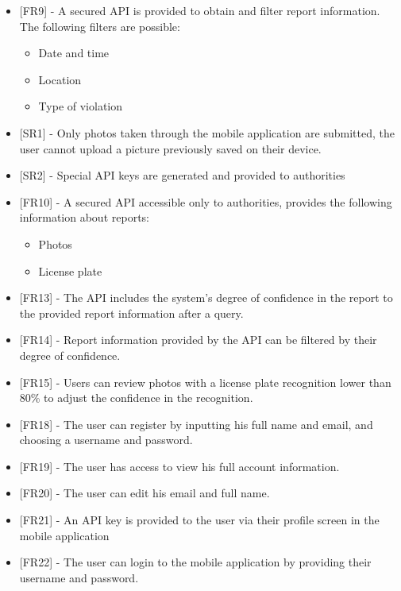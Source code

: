 \begin{itemize}[label={}]
            \item {[FR9]} - A secured API is provided to obtain and filter report information. The following filters are possible:
            \begin{itemize}[label={\textbullet}]
                \item Date and time
                \item Location
                \item Type of violation
            \end{itemize}

            \item {[SR1]} - Only photos taken through the mobile application are submitted, the user cannot upload a picture previously saved on their device.

            \item {[SR2]} - Special API keys are generated and provided to authorities
            \item {[FR10]} - A secured API accessible only to authorities, provides the following information about reports:
            \begin{itemize}[label={\textbullet}]
                \item Photos
                \item License plate
            \end{itemize}
            
            \item {[FR13]} - The API includes the system’s degree of confidence in the report to the provided report information after a query.
            \item {[FR14]} - Report information provided by the API can be filtered by their degree of confidence.
            \item {[FR15]} - Users can review photos with a license plate recognition lower than 80\% to adjust the confidence in the recognition.

            \item {[FR18]} - The user can register by inputting his full name and email, and choosing a username and password.
            \item {[FR19]} - The user has access to view his full account information.
            \item {[FR20]} - The user can edit his email and full name.
            \item {[FR21]} - An API key is provided to the user via their profile screen in the mobile application
            \item {[FR22]} - The user can login to the mobile application by providing their username and password.
\end{itemize}


